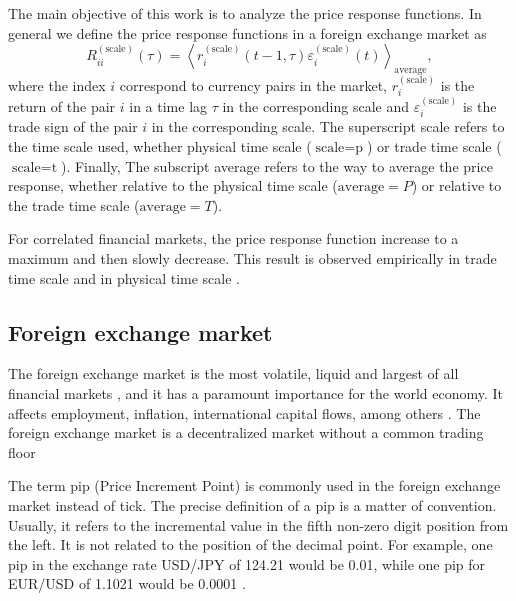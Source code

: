 The main objective of this work is to analyze the price response functions. In
general we define the price response functions in a foreign exchange market as
\begin{equation}\label{eq:response_general}
    R^{\left(\textrm{scale}\right)}_{ii}\left(\tau\right)=\left\langle
    r^{\left(\textrm{scale}\right)}_{i}\left(t-1, \tau\right)
    \varepsilon^{\left(\textrm{scale}\right)}_{i} \left(t\right)\right\rangle
    _{\textrm{average}},
\end{equation}
where the index $i$ correspond to currency pairs in the market,
$r^{\left(\textrm{scale}\right)}_{i}$ is the return of the pair $i$ in a time
lag $\tau$ in the corresponding scale and
$\varepsilon^{\left(\textrm{scale}\right)}_{i}$ is the trade sign of the pair
$i$ in the corresponding scale. The superscript scale refers to the time scale
used, whether physical time scale ($\textrm{scale} = \textrm{p}$) or trade time
scale ($\textrm{scale} = \textrm{t}$). Finally, The subscript average refers to
the way to average the price response, whether relative to the physical time
scale ($\textrm{average} = P$) or relative to the trade time scale
($\textrm{average} = T$).

For correlated financial markets, the price response function increase to a
maximum and then slowly decrease. This result is observed empirically in trade
time scale and in physical time scale
\cite{my_paper_response_financial,Wang_2016_avg}.

\subsection{Foreign exchange market}\label{subsec:forex_market}

The foreign exchange market is the most volatile, liquid and largest of all
financial markets
\cite{forex_liquidity,info_forex,forex_market_micro,intraday_forex}, and it has
a paramount importance for the world economy. It affects employment, inflation,
international capital flows, among others \cite{forex_structure}. The foreign
exchange market is a decentralized market without a common trading floor
\cite{info_forex,forex_market_micro,forex_structure,teach_spread}

The term pip (Price Increment Point) is commonly used in the foreign exchange
market instead of tick. The precise definition of a pip is a matter of
convention. Usually, it refers to the incremental value in the fifth non-zero
digit position from the left. It is not related to the position of the decimal
point. For example, one pip in the exchange rate USD/JPY of 124.21 would be
0.01, while one pip for EUR/USD of 1.1021 would be 0.0001
\cite{forex_market_micro,forex_structure,order_flow_forex,micro_eff}.